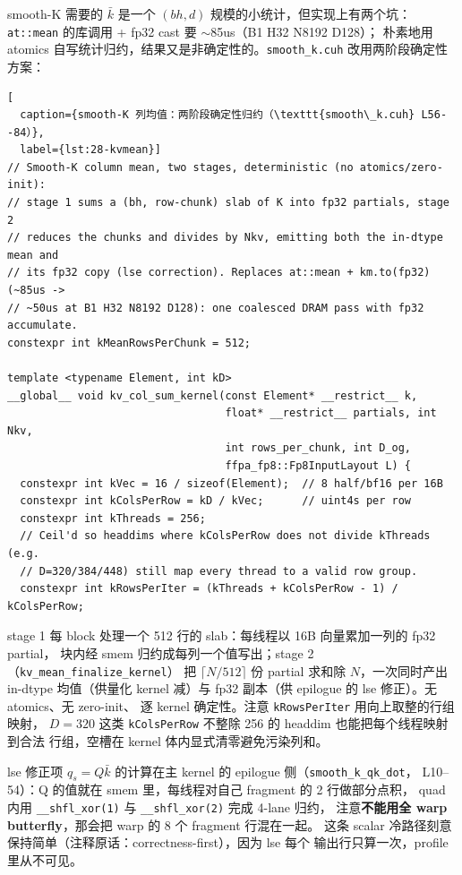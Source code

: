 smooth-K 需要的 $\bar k$ 是一个 $(bh, d)$ 规模的小统计，但实现上有两个坑：
\texttt{at::mean} 的库调用 + fp32 cast 要 $\sim$85us（B1 H32 N8192 D128）；
朴素地用 atomics 自写统计归约，结果又是非确定性的。\texttt{smooth\_k.cuh}
改用两阶段确定性方案：

\begin{lstlisting}[
  caption={smooth-K 列均值：两阶段确定性归约（\texttt{smooth\_k.cuh} L56--84）},
  label={lst:28-kvmean}]
// Smooth-K column mean, two stages, deterministic (no atomics/zero-init):
// stage 1 sums a (bh, row-chunk) slab of K into fp32 partials, stage 2
// reduces the chunks and divides by Nkv, emitting both the in-dtype mean and
// its fp32 copy (lse correction). Replaces at::mean + km.to(fp32) (~85us ->
// ~50us at B1 H32 N8192 D128): one coalesced DRAM pass with fp32 accumulate.
constexpr int kMeanRowsPerChunk = 512;

template <typename Element, int kD>
__global__ void kv_col_sum_kernel(const Element* __restrict__ k,
                                  float* __restrict__ partials, int Nkv,
                                  int rows_per_chunk, int D_og,
                                  ffpa_fp8::Fp8InputLayout L) {
  constexpr int kVec = 16 / sizeof(Element);  // 8 half/bf16 per 16B
  constexpr int kColsPerRow = kD / kVec;      // uint4s per row
  constexpr int kThreads = 256;
  // Ceil'd so headdims where kColsPerRow does not divide kThreads (e.g.
  // D=320/384/448) still map every thread to a valid row group.
  constexpr int kRowsPerIter = (kThreads + kColsPerRow - 1) / kColsPerRow;
\end{lstlisting}

stage 1 每 block 处理一个 512 行的 slab：每线程以 16B 向量累加一列的 fp32 partial，
块内经 smem 归约成每列一个值写出；stage 2（\texttt{kv\_mean\_finalize\_kernel}）
把 $\lceil N/512\rceil$ 份 partial 求和除 $N$，一次同时产出 in-dtype 均值（供量化
kernel 减）与 fp32 副本（供 epilogue 的 lse 修正）。无 atomics、无 zero-init、
逐 kernel 确定性。注意 \texttt{kRowsPerIter} 用向上取整的行组映射，
$D=320$ 这类 \texttt{kColsPerRow} 不整除 256 的 headdim 也能把每个线程映射到合法
行组，空槽在 kernel 体内显式清零避免污染列和。

lse 修正项 $q_s = Q\bar k$ 的计算在主 kernel 的 epilogue 侧（\texttt{smooth\_k\_qk\_dot}，
L10--54）：Q 的值就在 smem 里，每线程对自己 fragment 的 2 行做部分点积，
quad 内用 \texttt{\_\_shfl\_xor(1)} 与 \texttt{\_\_shfl\_xor(2)} 完成 4-lane 归约，
注意\textbf{不能用全 warp butterfly}，那会把 warp 的 8 个 fragment 行混在一起。
这条 scalar 冷路径刻意保持简单（注释原话：correctness-first），因为 lse 每个
输出行只算一次，profile 里从不可见。

